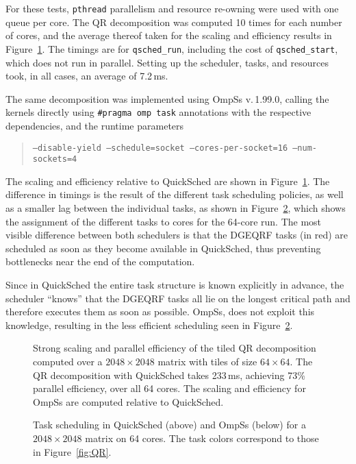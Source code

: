 \documentclass[preprint]{elsarticle}
\newcommand{\fig}[1]
    {Figure~\ref{fig:#1}}
\begin{document}
For these tests, {\tt pthread} parallelism and resource re-owning
were used with one queue per core.
The QR decomposition was computed 10 times for each number of
cores, and the average thereof taken for the scaling and
efficiency results in \fig{QRResults}.
The timings are for {\tt qsched\_run}, including the cost of
{\tt qsched\_start}, which does not run in parallel.
Setting up the scheduler, tasks, and resources took, in all
cases, an average of 7.2\,ms.

The same decomposition was implemented using OmpSs v.\,1.99.0,
calling the kernels directly using {\tt \#pragma omp task}
annotations with the respective dependencies, and
the runtime parameters
\begin{quote}
    \tt --disable-yield --schedule=socket --cores-per-socket=16 --num-sockets=4
\end{quote}
\noindent The scaling and efficiency relative to QuickSched are 
shown in \fig{QRResults}.
The difference in timings is the result of the different
task scheduling policies, as well as a smaller lag between the
individual tasks, as shown in \fig{QRTasks},
which shows the assignment of the different tasks to cores for the
64-core run.
The most visible difference between both schedulers is that
the DGEQRF tasks (in red) are scheduled as soon as they
become available in QuickSched, thus preventing bottlenecks
near the end of the computation.

Since in QuickSched the entire task structure is known explicitly
in advance, the scheduler ``knows'' that the DGEQRF tasks all
lie on the longest critical path and therefore executes them as
soon as possible.
OmpSs, does not exploit this knowledge, resulting in the less efficient
scheduling seen in \fig{QRTasks}.

\begin{figure}
    \centerline{}
    \caption{Strong scaling and parallel efficiency of the tiled QR decomposition
        computed over a $2048\times 2048$ matrix with tiles of size
        $64\times 64$.
        The QR decomposition with QuickSched takes 233\,ms,
        achieving 73\% parallel efficiency, over all 64 cores.
        The scaling and efficiency for OmpSs are computed relative to QuickSched.
        }
    \label{fig:QRResults}
\end{figure}

\begin{figure}
    \centerline{}
    \centerline{}
    \caption{Task scheduling in QuickSched (above) and OmpSs (below)
        for a $2048\times 2048$ matrix on 64 cores.
        The task colors correspond to those in \fig{QR}.}
    \label{fig:QRTasks}
\end{figure}
\end{document}
